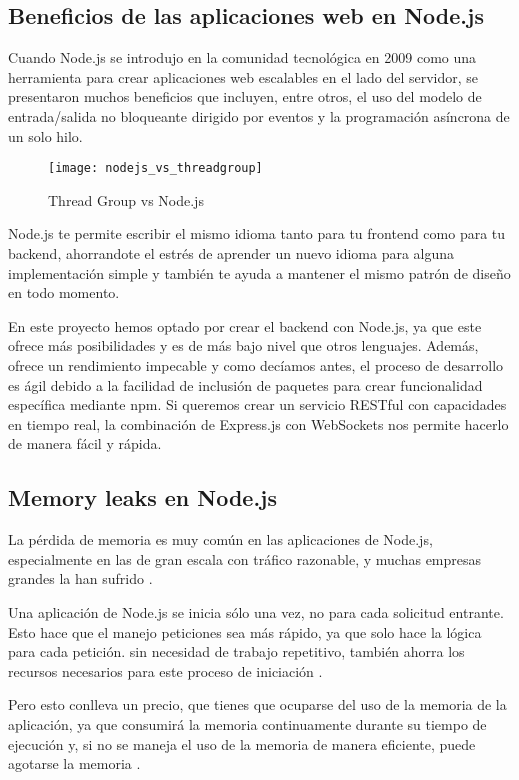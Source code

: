 \subsection{Beneficios de las aplicaciones web en Node.js}

Cuando Node.js se introdujo en la comunidad tecnológica en 2009 como una herramienta para crear aplicaciones web escalables en el lado del servidor, se presentaron muchos beneficios que incluyen, entre otros, el uso del modelo de entrada/salida no bloqueante dirigido por eventos y la programación asíncrona de un solo hilo.

\begin{figure}[htp!]
  \centering
  \texttt{[image: nodejs\_vs\_threadgroup]}
  \caption{Thread Group vs Node.js}
  \label{fig:nodejs_vs_threadgroup}
\end{figure}

Node.js te permite escribir el mismo idioma tanto para tu frontend como para tu backend, ahorrandote el estrés de aprender un nuevo idioma para alguna implementación simple y también te ayuda a mantener el mismo patrón de diseño en todo momento.

En este proyecto hemos optado por crear el backend con Node.js, ya que este ofrece más posibilidades y es de más bajo nivel que otros lenguajes. Además, ofrece un rendimiento impecable y como decíamos antes, el proceso de desarrollo es ágil debido a la facilidad de inclusión de paquetes para crear funcionalidad específica mediante npm. Si queremos crear un servicio RESTful con capacidades en tiempo real, la combinación de Express.js con WebSockets nos permite hacerlo de manera fácil y rápida.

\subsection{Memory leaks en Node.js}

La pérdida de memoria es muy común en las aplicaciones de Node.js, especialmente en las de gran escala con tráfico razonable, y muchas empresas grandes la han sufrido \cite{nodejs3}.

Una aplicación de Node.js se inicia sólo una vez, no para cada solicitud entrante. Esto hace que el manejo peticiones sea más rápido, ya que solo hace la lógica para cada petición. sin necesidad de trabajo repetitivo, también ahorra los recursos necesarios para este proceso de iniciación \cite{nodejs3}.

Pero esto conlleva un precio, que tienes que ocuparse del uso de la memoria de la aplicación, ya que consumirá la memoria continuamente durante su tiempo de ejecución y, si no se maneja el uso de la memoria de manera eficiente, puede agotarse la memoria \cite{nodejs3}.

